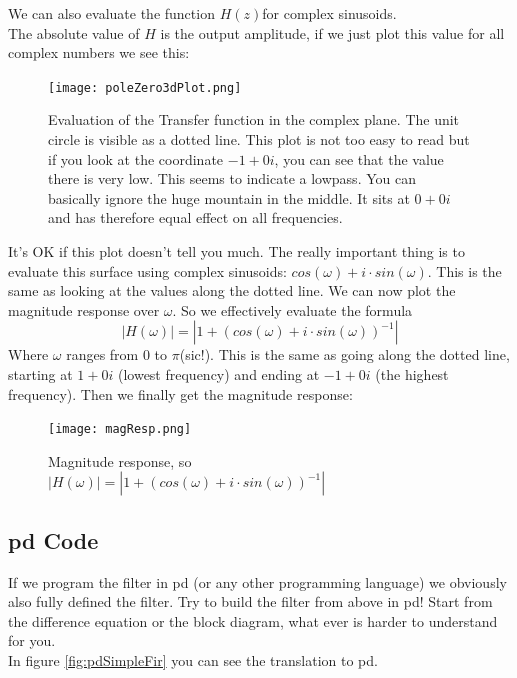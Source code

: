 {We can also evaluate the function $H(z)$for complex sinusoids.\\
The absolute value of $H$ is the output amplitude, if we just plot this value for all complex numbers we see this:

\begin{figure}[H]
	\centering
	\texttt{[image: poleZero3dPlot.png]}
	\caption[shortCaption]
	{Evaluation of the Transfer function in the complex plane. The unit circle is visible as a dotted line. This plot is not too easy to read but if you look at the coordinate $-1+0i$, you can see that the value there is very low. This seems to indicate a lowpass. You can basically ignore the huge mountain in the middle. It sits at $0+0i$ and has therefore equal effect on all frequencies.}
	\label{fig:label}
\end{figure}

It's OK if this plot doesn't tell you much. The really important thing is to evaluate this surface using complex sinusoids:
$cos(\omega) + i\cdot sin(\omega)$. This is the same as looking at the values along the dotted line. We can now plot the magnitude response over $\omega$. So we effectively evaluate the formula
\begin{equation}
	|H(\omega)| = |1 + (cos(\omega)+i \cdot sin(\omega))^{-1}|
\end{equation}
Where $\omega$ ranges from $0$ to $\pi$(sic!). This is the same as going along the dotted line, starting at $1+0i$ (lowest frequency) and ending at $-1+0i$ (the highest frequency). Then we finally get the magnitude response:

\begin{figure}[H]
	\centering
	\texttt{[image: magResp.png]}
	\caption[shortCaption]
	{Magnitude response, so $|H(\omega)| = |1 + (cos(\omega)+i \cdot sin(\omega))^{-1}|$}
	\label{fig:label}
\end{figure}



}

\subsection{pd Code} %
\label{sub:pd_code}
If we program the filter in pd (or any other programming language) we obviously also fully defined the filter. Try to build the filter from above in pd! Start from the difference equation or the block diagram, what ever is harder to understand for you.\\
In figure \ref{fig:pdSimpleFir} you can see the translation to pd.

